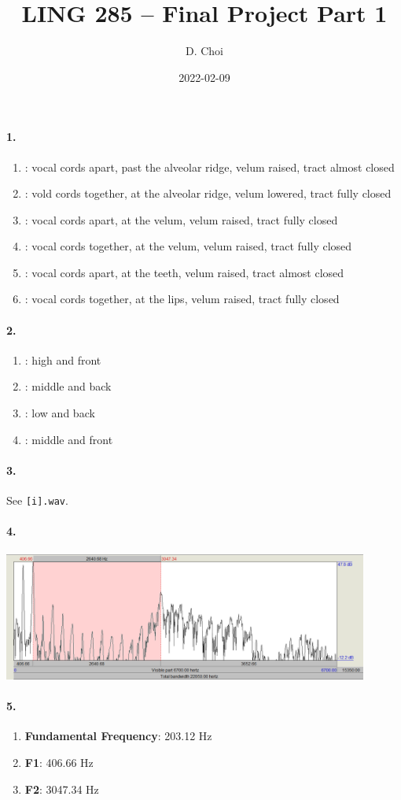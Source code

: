 \documentclass[12pt]{article}
\title{LING 285 -- Final Project Part 1}
\author{D. Choi}
\date{2022-02-09}
\begin{document}
\maketitle

\paragraph{1.}
\begin{enumerate}[label=\textbf{\alph*.}]
    \item \textbf{\textipa{[\textesh]}}: vocal cords apart, past the alveolar ridge, velum raised, tract almost closed
    \item \textbf{\textipa{[n]}}: vold cords together, at the alveolar ridge, velum lowered, tract fully closed
    \item \textbf{\textipa{[k]}}: vocal cords apart, at the velum, velum raised, tract fully closed
    \item \textbf{\textipa{[g]}}: vocal cords together, at the velum, velum raised, tract fully closed
    \item \textbf{\textipa{[\texttheta]}}: vocal cords apart, at the teeth, velum raised, tract almost closed
    \item \textbf{\textipa{[b]}}: vocal cords together, at the lips, velum raised, tract fully closed
\end{enumerate}

\paragraph{2.}
\begin{enumerate}[label=\textbf{\alph*.}]
    \item \textbf{\textipa{[\textsci]}}: high and front
    \item \textbf{\textipa{[o]}}: middle and back
    \item \textbf{\textipa{[\textscripta]}}: low and back
    \item \textbf{\textipa{[e]}}: middle and front
\end{enumerate}

\paragraph{3.}
See \texttt{[i].wav}.

\paragraph{4.}
\includegraphics[width=0.9\textwidth]{[i]-spectrum.png}

\paragraph{5.}
\begin{enumerate}[label=\textbf{\alph*.}]
    \item \textbf{Fundamental Frequency}: 203.12 Hz
    \item \textbf{F1}: 406.66 Hz
    \item \textbf{F2}: 3047.34 Hz
\end{enumerate}
\end{document}
